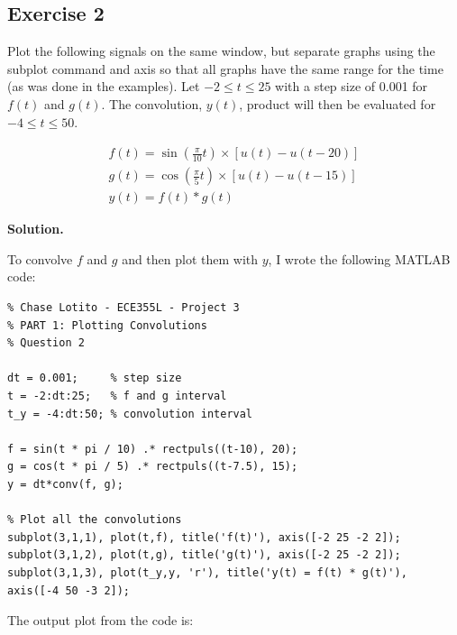 \documentclass{article}
\begin{document}
\clearpage

\subsection*{Exercise 2}

Plot the following signals on the same window, but separate graphs using the subplot command and axis so that all graphs have the same range for the time (as was done in the examples). Let \(-2 \leq t \leq 25\) with a step size of 0.001 for \(f(t)\) and \(g(t)\). The convolution, \(y(t)\), product will then be evaluated for \(-4 \leq t \leq 50\).

\begin{equation*}
    \begin{gathered}
        f(t) = \sin \left( \frac{\pi}{10} t \right) \times [u(t) - u(t-20)] \\
        g(t) = \cos \left( \frac{\pi}{5} t \right) \times [u(t) - u(t-15)]  \\
        y(t) = f(t) * g(t)
    \end{gathered}
\end{equation*}

\smallskip

\textbf{Solution.}

\smallskip

To convolve \(f\) and \(g\) and then plot them with \(y\), I wrote the following MATLAB code:

\begin{lstlisting}
% Chase Lotito - ECE355L - Project 3
% PART 1: Plotting Convolutions
% Question 2

dt = 0.001;     % step size
t = -2:dt:25;   % f and g interval
t_y = -4:dt:50; % convolution interval

f = sin(t * pi / 10) .* rectpuls((t-10), 20);
g = cos(t * pi / 5) .* rectpuls((t-7.5), 15);
y = dt*conv(f, g);

% Plot all the convolutions
subplot(3,1,1), plot(t,f), title('f(t)'), axis([-2 25 -2 2]);
subplot(3,1,2), plot(t,g), title('g(t)'), axis([-2 25 -2 2]);
subplot(3,1,3), plot(t_y,y, 'r'), title('y(t) = f(t) * g(t)'), axis([-4 50 -3 2]);
\end{lstlisting}

The output plot from the code is:
\end{document}

